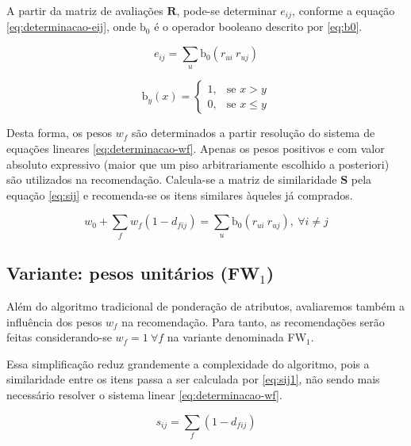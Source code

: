 A partir da matriz de avaliações $\mathbf{R}$, pode-se determinar $e_{ij}$, conforme a equação \ref{eq:determinacao-eij}, onde $\mathrm{b_0}$ é o operador booleano descrito por \ref{eq:b0}.

\begin{equation}
\label{eq:determinacao-eij} 
    e_{ij} = \sum_{u}{\mathrm{b_0}\left(r_{ui} ~ r_{uj}\right)}
\end{equation} 

\begin{equation}
\label{eq:b0}
\mathrm{b}_y\left(x\right) = 
\begin{cases}
1, &\text{se }x>y \\
0, &\text{se }x\leq y
\end{cases} 
\end{equation}

Desta forma, os pesos $w_f$ são determinados a partir resolução do sistema de equações lineares \ref{eq:determinacao-wf}. Apenas os pesos positivos e com valor absoluto expressivo (maior que um piso arbitrariamente escolhido a posteriori) são utilizados na recomendação. Calcula-se a matriz de similaridade $\mathbf{S}$ pela equação \ref{eq:sij} e recomenda-se os itens similares àqueles já comprados.  

\begin{equation}
\label{eq:determinacao-wf} 
    w_0 + \sum_{f}{w_{f}  \left(1-d_{fij}\right)} = \sum_{u}{\mathrm{b_0}\left(r_{ui} ~ r_{uj}\right)},~\forall i \neq j 
\end{equation} 

\subsection{Variante: pesos unitários (FW$_1$)} %
\label{sub:variante_pesos_unit_rios}

Além do algoritmo tradicional de ponderação de atributos, avaliaremos também a influência dos pesos $w_f$ na recomendação. Para tanto, as recomendações serão feitas considerando-se $w_f = 1~\forall f$ na variante denominada FW$_1$. 

Essa simplificação reduz grandemente a complexidade do algoritmo, pois a similaridade entre os itens passa a ser calculada por \ref{eq:sij1}, não sendo mais necessário  resolver o sistema linear \ref{eq:determinacao-wf}.

\begin{equation} 
\label{eq:sij1}
    s_{ij} = \sum_{f}{\left(1-d_{fij}\right)}
\end{equation}


